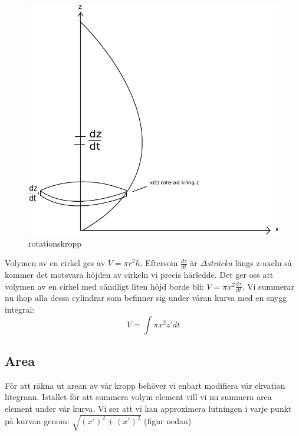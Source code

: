\documentclass[a4paper,10pt]{article}
\begin{document}
\begin{figure}[htp]
\centering
\includegraphics[scale=0.8]{volym}
\caption{rotationskropp}\label{fig:rotationskropp}
\end{figure}

Volymen av en cirkel ges av $V=\pi r^2 h$. Eftersom $ \frac{dz}{dt} $ är $\Delta$\emph{sträcka} längs z-axeln så kommer det motsvara höjden av cirkeln vi precis härledde. Det ger oss att volymen av en cirkel med oändligt liten höjd borde bli: $ V = \pi x^2 \frac{dz}{dt} $. Vi summerar nu ihop alla dessa cylindrar som befinner sig under våran kurva med en snygg integral:
$$V=\int \pi x^2 z' dt $$

\subsection{Area}
För att räkna ut arean av vår kropp behöver vi enbart modifiera vår ekvation litegrann. Istället för att summera volym element vill vi nu summera area element under vår kurva. Vi ser att vi kan approximera lutningen i varje punkt på kurvan genom: $ \sqrt{(x')^2+(x')^2} $ (figur nedan)
\end{document}
